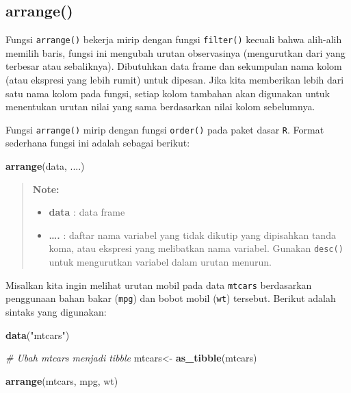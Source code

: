\documentclass[]{book}
\newenvironment{Shaded}{\begin{snugshade}}{\end{snugshade}}
\newcommand{\KeywordTok}[1]{\textcolor[rgb]{0.13,0.29,0.53}{\textbf{#1}}}
\newcommand{\StringTok}[1]{\textcolor[rgb]{0.31,0.60,0.02}{#1}}
\newcommand{\CommentTok}[1]{\textcolor[rgb]{0.56,0.35,0.01}{\textit{#1}}}
\newcommand{\NormalTok}[1]{#1}
\providecommand{\tightlist}{%
  \setlength{\itemsep}{0pt}\setlength{\parskip}{0pt}}
\begin{document}
\subsection{arrange()}\label{arrange}

Fungsi \texttt{arrange()} bekerja mirip dengan fungsi \texttt{filter()}
kecuali bahwa alih-alih memilih baris, fungsi ini mengubah urutan
observasinya (mengurutkan dari yang terbesar atau sebaliknya).
Dibutuhkan data frame dan sekumpulan nama kolom (atau ekspresi yang
lebih rumit) untuk dipesan. Jika kita memberikan lebih dari satu nama
kolom pada fungsi, setiap kolom tambahan akan digunakan untuk menentukan
urutan nilai yang sama berdasarkan nilai kolom sebelumnya.

Fungsi \texttt{arrange()} mirip dengan fungsi \texttt{order()} pada
paket dasar \texttt{R}. Format sederhana fungsi ini adalah sebagai
berikut:

\begin{Shaded}
\begin{Highlighting}[]
\KeywordTok{arrange}\NormalTok{(data, ....)}
\end{Highlighting}
\end{Shaded}

\begin{quote}
\textbf{Note: }

\begin{itemize}
\tightlist
\item
  \textbf{data} : data frame
\item
  \textbf{\ldots{}.} : daftar nama variabel yang tidak dikutip yang
  dipisahkan tanda koma, atau ekspresi yang melibatkan nama variabel.
  Gunakan \texttt{desc()} untuk mengurutkan variabel dalam urutan
  menurun.
\end{itemize}
\end{quote}

Misalkan kita ingin melihat urutan mobil pada data \texttt{mtcars}
berdasarkan penggunaan bahan bakar (\texttt{mpg}) dan bobot mobil
(\texttt{wt}) tersebut. Berikut adalah sintaks yang digunakan:

\begin{Shaded}
\begin{Highlighting}[]
\KeywordTok{data}\NormalTok{(}\StringTok{"mtcars"}\NormalTok{)}

\CommentTok{# Ubah mtcars menjadi tibble}
\NormalTok{mtcars<-}\StringTok{ }\KeywordTok{as_tibble}\NormalTok{(mtcars)}

\KeywordTok{arrange}\NormalTok{(mtcars, mpg, wt)}
\end{Highlighting}
\end{Shaded}
\end{document}
